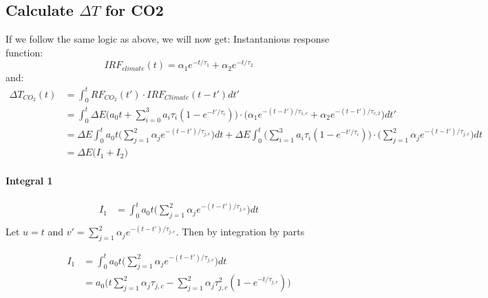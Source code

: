 \documentclass[11pt]{article}
\begin{document}
    \begin{figure}
        \begin{center}\end{center}
        \caption{}
        \label{}
    \end{figure}
    
    \hypertarget{calculate-delta-t-for-co2}{%
\subsection{\texorpdfstring{Calculate \(\Delta T\) for
CO2}{Calculate \textbackslash Delta T for CO2}}\label{calculate-delta-t-for-co2}}

    If we follow the same logic as above, we will now get: Instantanious
response function: \[
IRF_{climate}(t) = \alpha_1 e^{-t/\tau_1}+\alpha_2 e^{-t/\tau_2}
\] and: \begin{align*}
\Delta T_{CO_2} (t) & = \int_0^t RF_{CO_2}(t') \cdot IRF_{Climate}(t-t') dt' \\
&= \int_0^t \Delta E \Big(a_0t + \sum_{i=0}^3 a_i \tau_i (1- e^{-t'/\tau_i})\Big) \cdot \Big(\alpha_1 e^{-(t-t')/\tau_{1,c}} + \alpha_2 e^{-(t-t')/\tau_{c,2}}\Big) dt'\\
&= \Delta E \int_0^t a_0t (\sum_{j=1}^2 \alpha_j e^{-(t-t')/\tau_{j,c}}\big) dt +\Delta E \int_0^t \Big(\sum_{i=1}^3  a_i \tau_i (1- e^{-t'/\tau_i}) \Big) \cdot \Big(\sum_{j=1}^2  \alpha_j e^{-(t-t')/\tau_{j,c}}\Big) dt\\
&= \Delta E \big(I_1 + I_2)
\end{align*}

    \hypertarget{integral-1}{%
\paragraph{Integral 1}\label{integral-1}}

\begin{align*}
I_1 & = \int_0^t a_0t (\sum_{j=1}^2 \alpha_j e^{-(t-t')/\tau_{j,c}}\big) dt \\
\end{align*} Let \(u = t\) and
\(v' = \sum_{j=1}^2 \alpha_j e^{-(t-t')/\tau_{j,c}}\). Then by
integration by parts

    \begin{align*}
I_1 & = \int_0^t a_0t (\sum_{j=1}^2 \alpha_j e^{-(t-t')/\tau_{j,c}}\big) dt \\
 &= a_0 \Big(t \sum_{j=1}^2 \alpha_j \tau_{j,c} - \sum_{j=1}^2 \alpha_j \tau_{j,c}^2 (1-e^{-t/\tau_{j,c}})\Big)
\end{align*}
\end{document}
